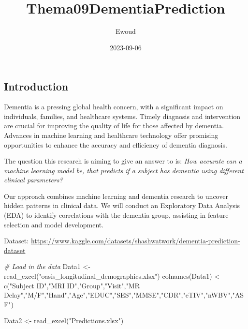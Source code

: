 \documentclass[
]{article}
\title{Thema09DementiaPrediction}
\author{Ewoud}
\date{2023-09-06}
\newenvironment{Shaded}{\begin{snugshade}}{\end{snugshade}}
\newcommand{\CommentTok}[1]{\textcolor[rgb]{0.56,0.35,0.01}{\textit{#1}}}
\newcommand{\FunctionTok}[1]{\textcolor[rgb]{0.00,0.00,0.00}{#1}}
\newcommand{\NormalTok}[1]{#1}
\newcommand{\OtherTok}[1]{\textcolor[rgb]{0.56,0.35,0.01}{#1}}
\newcommand{\StringTok}[1]{\textcolor[rgb]{0.31,0.60,0.02}{#1}}
\begin{document}
\maketitle

\hypertarget{introduction}{%
\subsection{Introduction}\label{introduction}}

Dementia is a pressing global health concern, with a significant impact
on individuals, families, and healthcare systems. Timely diagnosis and
intervention are crucial for improving the quality of life for those
affected by dementia. Advances in machine learning and healthcare
technology offer promising opportunities to enhance the accuracy and
efficiency of dementia diagnosis.

The question this research is aiming to give an answer to is: \emph{How
accurate can a machine learning model be, that predicts if a subject has
dementia using different clinical parameters?}

Our approach combines machine learning and dementia research to uncover
hidden patterns in clinical data. We will conduct an Exploratory Data
Analysis (EDA) to identify correlations with the dementia group,
assisting in feature selection and model development.

Dataset:
\url{https://www.kaggle.com/datasets/shashwatwork/dementia-prediction-dataset}

\begin{Shaded}
\begin{Highlighting}[]
\CommentTok{\# Load in the data }
\NormalTok{Data1 }\OtherTok{\textless{}{-}} \FunctionTok{read\_excel}\NormalTok{(}\StringTok{"oasis\_longitudinal\_demographics.xlsx"}\NormalTok{)}
\FunctionTok{colnames}\NormalTok{(Data1) }\OtherTok{\textless{}{-}} \FunctionTok{c}\NormalTok{(}\StringTok{"Subject ID"}\NormalTok{,}\StringTok{"MRI ID"}\NormalTok{,}\StringTok{"Group"}\NormalTok{,}\StringTok{"Visit"}\NormalTok{,}\StringTok{"MR Delay"}\NormalTok{,}\StringTok{"M/F"}\NormalTok{,}\StringTok{"Hand"}\NormalTok{,}\StringTok{"Age"}\NormalTok{,}\StringTok{"EDUC"}\NormalTok{,}\StringTok{"SES"}\NormalTok{,}\StringTok{"MMSE"}\NormalTok{,}\StringTok{"CDR"}\NormalTok{,}\StringTok{"eTIV"}\NormalTok{,}\StringTok{"nWBV"}\NormalTok{,}\StringTok{"ASF"}\NormalTok{)}

\NormalTok{Data2 }\OtherTok{\textless{}{-}} \FunctionTok{read\_excel}\NormalTok{(}\StringTok{"Predictions.xlsx"}\NormalTok{)}
\end{Highlighting}
\end{Shaded}
\end{document}
